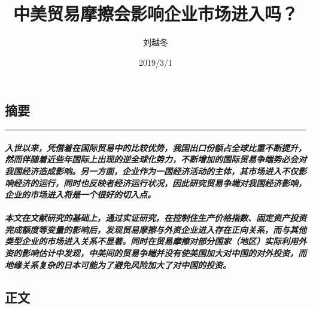\documentclass[]{article}
\title{中美贸易摩擦会影响企业市场进入吗？}
\author{刘越冬}
\date{2019/3/1}
\let\oldparagraph\paragraph
\renewcommand{\paragraph}[1]{\oldparagraph{#1}\mbox{}}
\begin{document}
\maketitle

\hypertarget{section}{%
\subsection{\texorpdfstring{\textbf{摘要}}{摘要}}\label{section}}

\begin{center}\rule{0.5\linewidth}{\linethickness}\end{center}

\hypertarget{section-1}{%
\paragraph{\texorpdfstring{\emph{入世以来，凭借着在国际贸易中的比较优势，我国出口份额占全球比重不断提升，然而伴随着近些年国际上出现的逆全球化势力，不断增加的国际贸易争端势必会对我国经济造成影响。另一方面，企业作为一国经济活动的主体，其市场进入不仅影响经济的运行，同时也反映者经济运行状况，因此研究贸易争端对我国经济影响，企业的市场进入将是一个很好的切入点。}}{入世以来，凭借着在国际贸易中的比较优势，我国出口份额占全球比重不断提升，然而伴随着近些年国际上出现的逆全球化势力，不断增加的国际贸易争端势必会对我国经济造成影响。另一方面，企业作为一国经济活动的主体，其市场进入不仅影响经济的运行，同时也反映者经济运行状况，因此研究贸易争端对我国经济影响，企业的市场进入将是一个很好的切入点。}}\label{section-1}}

\hypertarget{section-2}{%
\paragraph{\texorpdfstring{\emph{本文在文献研究的基础上，通过实证研究，在控制住生产价格指数、固定资产投资完成额度等变量的影响后，发现贸易摩擦与外资企业进入存在正向关系，而与其他类型企业的市场进入关系不显著。同时在贸易摩擦对部分国家（地区）实际利用外资的影响估计中发现，中美间的贸易争端并没有使美国加大对中国的对外投资，而地缘关系复杂的日本可能为了避免风险加大了对中国的投资。}}{本文在文献研究的基础上，通过实证研究，在控制住生产价格指数、固定资产投资完成额度等变量的影响后，发现贸易摩擦与外资企业进入存在正向关系，而与其他类型企业的市场进入关系不显著。同时在贸易摩擦对部分国家（地区）实际利用外资的影响估计中发现，中美间的贸易争端并没有使美国加大对中国的对外投资，而地缘关系复杂的日本可能为了避免风险加大了对中国的投资。}}\label{section-2}}

\hypertarget{section-3}{%
\subsection{\texorpdfstring{\textbf{正文}}{正文}}\label{section-3}}
\end{document}
